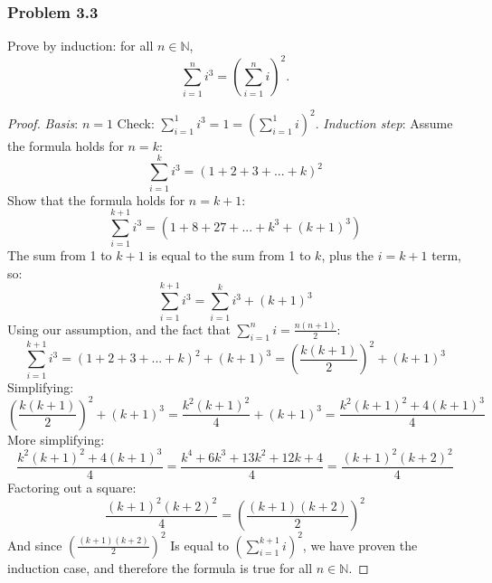 \documentclass[hidelinks,12pt]{article}
\newcommand{\N}{\mathbb{N}}
\begin{document}
\subsubsection{Problem 3.3}
Prove by induction: for all $n \in \N$,
\begin{displaymath}
\sum_{i=1}^{n}i^3=(\sum_{i=1}^{n}i)^2.
\end{displaymath}
\begin{proof}\emph{Basis}: $n=1$ Check: $\sum_{i=1}^{1}i^3=1=(\sum_{i=1}^{1}i)^2.$
\newline\emph{Induction step}: Assume the formula holds for $n=k$:
\begin{displaymath}
\sum_{i=1}^{k}i^3=(1+2+3+...+k)^2
\end{displaymath}
Show that the formula holds for $n=k+1$:
\begin{displaymath}
\sum_{i=1}^{k+1}i^3=(1+8+27+...+k^3+(k+1)^3)
\end{displaymath}
The sum from 1 to $k+1$ is equal to the sum from 1 to $k$, plus the $i=k+1$ term, so:
\begin{displaymath}
\sum_{i=1}^{k+1}i^3=\sum_{i=1}^{k}i^3+(k+1)^3
\end{displaymath}
Using our assumption, and the fact that $\sum_{i=1}^{n}i = \frac{n(n+1)}{2}$:
\begin{displaymath}
\sum_{i=1}^{k+1}i^3=(1+2+3+...+k)^2+(k+1)^3=(\frac{k(k+1)}{2})^2+(k+1)^3
\end{displaymath}
Simplifying:
\begin{displaymath}
(\frac{k(k+1)}{2})^2+(k+1)^3=\frac{k^2(k+1)^2}{4}+(k+1)^3=\frac{k^2(k+1)^2+4(k+1)^3}{4}
\end{displaymath}
More simplifying:
\begin{displaymath}
\frac{k^2(k+1)^2+4(k+1)^3}{4}=\frac{k^4+6k^3+13k^2+12k+4}{4}=\frac{(k+1)^2(k+2)^2}{4}
\end{displaymath}
Factoring out a square:
\begin{displaymath}
\frac{(k+1)^2(k+2)^2}{4}=(\frac{(k+1)(k+2)}{2})^2
\end{displaymath}
And since $(\frac{(k+1)(k+2)}{2})^2$ Is equal to $(\sum_{i=1}^{k+1}i)^2$, we have proven the induction case, and therefore the formula is true for all $n \in \N$. \end{proof}
\end{document}
